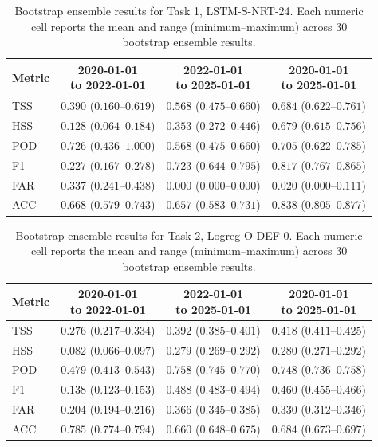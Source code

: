 \begin{table}[htbp]
\centering
\small
\caption{Bootstrap ensemble results for Task 1, LSTM-S-NRT-24. Each numeric cell reports the mean and range (minimum--maximum) across 30 bootstrap ensemble results.}
\label{tab:app-task1-lstm-s-nrt-24}
\begin{tabular}{lccc}
\toprule
Metric & \shortstack{2020-01-01\\to 2022-01-01} & \shortstack{2022-01-01\\to 2025-01-01} & \shortstack{2020-01-01\\to 2025-01-01} \\
\midrule
TSS & $0.390$ ($0.160$--$0.619$) & $0.568$ ($0.475$--$0.660$) & $0.684$ ($0.622$--$0.761$) \\
HSS & $0.128$ ($0.064$--$0.184$) & $0.353$ ($0.272$--$0.446$) & $0.679$ ($0.615$--$0.756$) \\
POD & $0.726$ ($0.436$--$1.000$) & $0.568$ ($0.475$--$0.660$) & $0.705$ ($0.622$--$0.785$) \\
F1 & $0.227$ ($0.167$--$0.278$) & $0.723$ ($0.644$--$0.795$) & $0.817$ ($0.767$--$0.865$) \\
FAR & $0.337$ ($0.241$--$0.438$) & $0.000$ ($0.000$--$0.000$) & $0.020$ ($0.000$--$0.111$) \\
ACC & $0.668$ ($0.579$--$0.743$) & $0.657$ ($0.583$--$0.731$) & $0.838$ ($0.805$--$0.877$) \\
\bottomrule
\end{tabular}
\end{table}
\clearpage

\begin{table}[htbp]
\centering
\small
\caption{Bootstrap ensemble results for Task 2, Logreg-O-DEF-0. Each numeric cell reports the mean and range (minimum--maximum) across 30 bootstrap ensemble results.}
\label{tab:app-task2-logreg-o-def-0}
\begin{tabular}{lccc}
\toprule
Metric & \shortstack{2020-01-01\\to 2022-01-01} & \shortstack{2022-01-01\\to 2025-01-01} & \shortstack{2020-01-01\\to 2025-01-01} \\
\midrule
TSS & $0.276$ ($0.217$--$0.334$) & $0.392$ ($0.385$--$0.401$) & $0.418$ ($0.411$--$0.425$) \\
HSS & $0.082$ ($0.066$--$0.097$) & $0.279$ ($0.269$--$0.292$) & $0.280$ ($0.271$--$0.292$) \\
POD & $0.479$ ($0.413$--$0.543$) & $0.758$ ($0.745$--$0.770$) & $0.748$ ($0.736$--$0.758$) \\
F1 & $0.138$ ($0.123$--$0.153$) & $0.488$ ($0.483$--$0.494$) & $0.460$ ($0.455$--$0.466$) \\
FAR & $0.204$ ($0.194$--$0.216$) & $0.366$ ($0.345$--$0.385$) & $0.330$ ($0.312$--$0.346$) \\
ACC & $0.785$ ($0.774$--$0.794$) & $0.660$ ($0.648$--$0.675$) & $0.684$ ($0.673$--$0.697$) \\
\bottomrule
\end{tabular}
\end{table}
\clearpage

